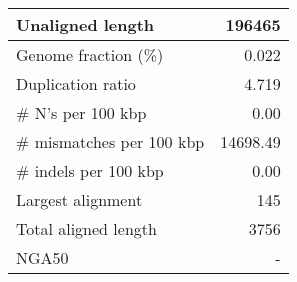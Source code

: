 \documentclass[12pt,a4paper]{article}
\begin{document}
\begin{table}[ht]
\begin{center}
\begin{tabular}{|l*{1}{|r}|}
Unaligned length & 196465 \\ \hline
Genome fraction (\%) & 0.022 \\ \hline
Duplication ratio & 4.719 \\ \hline
\# N's per 100 kbp & 0.00 \\ \hline
\# mismatches per 100 kbp & 14698.49 \\ \hline
\# indels per 100 kbp & 0.00 \\ \hline
Largest alignment & 145 \\ \hline
Total aligned length & 3756 \\ \hline
NGA50 & - \\ \hline
\end{tabular}
\end{center}
\end{table}
\end{document}
